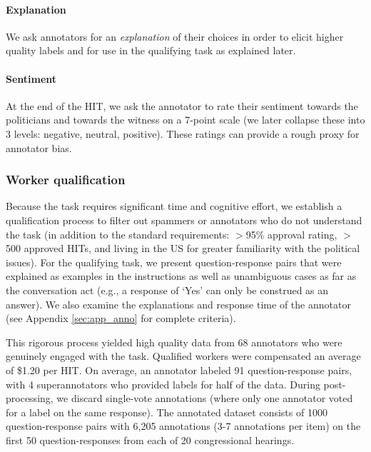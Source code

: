 \paragraph{Explanation} We ask annotators for an \emph{explanation} of their choices in order to elicit higher quality labels \cite{McDonnell:2016} and for use in the qualifying task as explained later. 

\paragraph{Sentiment} At the end of the HIT, we ask the annotator to rate their sentiment towards the politicians and towards the witness on a 7-point scale (we later collapse these into 3 levels: negative, neutral, positive). These ratings can provide a rough proxy for annotator bias. 

\subsubsection{Worker qualification}
Because the task requires significant time and cognitive effort, we establish a qualification process to filter out spammers or annotators who do not understand the task (in addition to the standard requirements: $>$95\% approval rating, $>$500 approved HITs, and living in the US for greater familiarity with the political issues). For the qualifying task, we present question-response pairs that were explained as examples in the instructions as well as unambiguous cases as far as the conversation act (e.g., a response of `Yes' can only be construed as an answer). We also examine the explanations and response time of the annotator (see Appendix \ref{sec:app_anno} for complete criteria). 

This rigorous process yielded high quality data from 68 annotators who were genuinely engaged with the task. Qualified workers were compensated an average of \$1.20 per HIT. On average, an annotator labeled 91 question-response pairs, with 4 superannotators who provided labels for half of the data. During post-processing, we discard single-vote annotations (where only one annotator voted for a label on the same response). The annotated dataset consists of 1000 question-response pairs with 6,205 annotations (3-7 annotations per item) on the first 50 question-responses from each of 20 congressional hearings. 

